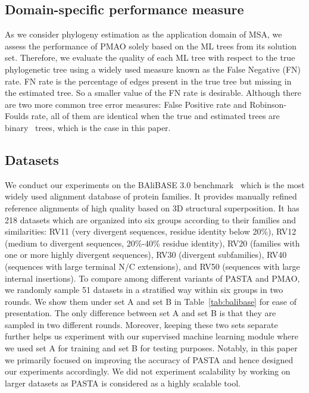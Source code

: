 \documentclass[a4paper,fleqn, review]{cas-dc}
\begin{document}
\subsection{Domain-specific performance measure}
As we consider phylogeny estimation as the application domain of MSA, we assess the performance of PMAO solely based on the ML trees from its solution set. Therefore, we evaluate the quality of each ML tree with respect to the true phylogenetic tree
using a widely used measure known as the False Negative (FN) rate. FN rate is the percentage of edges present in the true tree but missing in the estimated tree. So a smaller value of the FN rate
is desirable. Although there are two more common tree error measures: False Positive rate and Robinson-Foulds rate, all of them are identical when the true and estimated trees are
binary~\cite{warnow2017computational} trees, which is the case in this paper.


\subsection{Datasets}
We conduct our experiments on the BAliBASE 3.0 benchmark~\cite{thompson2005balibase} which is the most widely used alignment database of protein families. It provides manually refined reference alignments of high quality based on 3D structural superposition. It has 218 datasets which are organized into six groups according to their families and similarities: RV11
(very divergent sequences, residue identity below 20\%), RV12 (medium to divergent sequences, 20\%-40\% residue identity), RV20 (families with one or more highly divergent sequences), RV30 (divergent subfamilies), RV40 (sequences with large terminal N/C extensions), and RV50 (sequences with large internal insertions). To compare among different variants of PASTA and PMAO, we randomly sample 51 datasets in a stratified way within six groups in two rounds. We show them under set A and set B in Table~\ref{tab:balibase} for ease of presentation. The only difference between set A and set B is that they are sampled in two different rounds. Moreover, keeping these two sets separate further helps us experiment with our supervised machine learning module where we used set A for training and set B for testing purposes. 
Notably, in this paper we primarily focused on improving the accuracy of PASTA and hence designed our experiments accordingly. We did not experiment scalability by working on larger datasets as PASTA is considered as a highly scalable tool.
\end{document}

